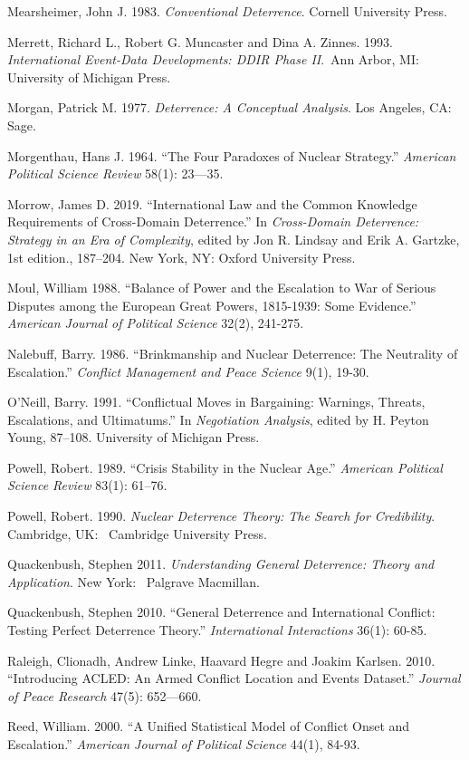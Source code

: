 \documentclass[
]{article}
\begin{document}
Mearsheimer, John J. 1983. \emph{Conventional Deterrence}. Cornell
University Press.

Merrett, Richard L., Robert G. Muncaster and Dina A. Zinnes. 1993.
\emph{International Event-Data Developments: DDIR Phase II}.~Ann Arbor,
MI: University of Michigan Press.

Morgan, Patrick M. 1977. \emph{Deterrence: A Conceptual Analysis}. Los
Angeles, CA: Sage.

Morgenthau, Hans J. 1964. ``The Four Paradoxes of Nuclear Strategy.''
\emph{American Political Science Review} 58(1): 23---35.

Morrow, James D. 2019. ``International Law and the Common Knowledge
Requirements of Cross-Domain Deterrence.'' In \emph{Cross-Domain
Deterrence: Strategy in an Era of Complexity}, edited by Jon R. Lindsay
and Erik A. Gartzke, 1st edition., 187--204. New York, NY: Oxford
University Press.

Moul, William 1988. ``Balance of Power and the Escalation to War of
Serious Disputes among the European Great Powers, 1815-1939: Some
Evidence.'' \emph{American Journal of Political Science} 32(2), 241-275.

Nalebuff, Barry. 1986. ``Brinkmanship and Nuclear Deterrence: The
Neutrality of Escalation.'' \emph{Conflict Management and Peace Science}
9(1), 19-30.

O'Neill, Barry. 1991. ``Conflictual Moves in Bargaining: Warnings,
Threats, Escalations, and Ultimatums.'' In \emph{Negotiation Analysis},
edited by H. Peyton Young, 87--108. University of Michigan Press.

Powell, Robert. 1989. ``Crisis Stability in the Nuclear Age.''
\emph{American Political Science Review} 83(1): 61--76.

Powell, Robert. 1990. \emph{Nuclear Deterrence Theory: The Search for
Credibility}. Cambridge, UK:~ Cambridge University Press.

Quackenbush, Stephen 2011. \emph{Understanding General Deterrence:
Theory and Application}. New York:~ Palgrave Macmillan.~

Quackenbush, Stephen 2010. ``General Deterrence and International
Conflict: Testing Perfect Deterrence Theory.'' \emph{International
Interactions} 36(1): 60-85.

Raleigh, Clionadh, Andrew Linke, Haavard Hegre and Joakim Karlsen. 2010.
``Introducing ACLED: An Armed Conflict Location and Events Dataset.''
\emph{Journal of Peace Research} 47(5): 652---660.

Reed, William. 2000. ``A Unified Statistical Model of Conflict Onset and
Escalation.'' \emph{American Journal of Political Science} 44(1), 84-93.
\end{document}
